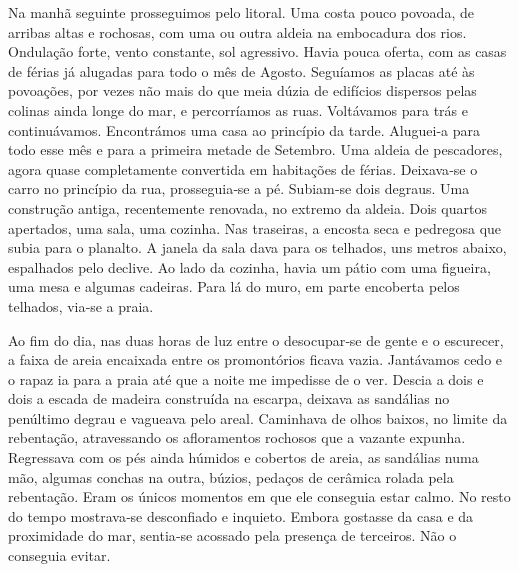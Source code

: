 Na manhã seguinte prosseguimos pelo litoral. Uma costa pouco povoada, de
arribas altas e rochosas, com uma ou outra aldeia na embocadura dos
rios. Ondulação forte, vento constante, sol agressivo. Havia pouca
oferta, com as casas de férias já alugadas para todo o mês de Agosto.
Seguíamos as placas até às povoações, por vezes não mais do que meia
dúzia de edifícios dispersos pelas colinas ainda longe do mar, e
percorríamos as ruas. Voltávamos para trás e continuávamos. Encontrámos
uma casa ao princípio da tarde. Aluguei­‑a para todo esse mês e para a
primeira metade de Setembro. Uma aldeia de pescadores, agora quase
completamente convertida em habitações de férias. Deixava­‑se o carro no
princípio da rua, prosseguia­‑se a pé. Subiam­‑se dois degraus. Uma
construção antiga, recentemente renovada, no extremo da aldeia. Dois
quartos apertados, uma sala, uma cozinha. Nas traseiras, a encosta seca
e pedregosa que subia para o planalto. A janela da sala dava para os
telhados, uns metros abaixo, espalhados pelo declive. Ao lado da
cozinha, havia um pátio com uma figueira, uma mesa e algumas cadeiras.
Para lá do muro, em parte encoberta pelos telhados, via­‑se a praia.

Ao fim do dia, nas duas horas de luz entre o desocupar­‑se de gente e o
escurecer, a faixa de areia encaixada entre os promontórios ficava
vazia. Jantávamos cedo e o rapaz ia para a praia até que a noite me
impedisse de o ver. Descia a dois e dois a escada de madeira construída
na escarpa, deixava as sandálias no penúltimo degrau e vagueava pelo
areal. Caminhava de olhos baixos, no limite da rebentação, atravessando
os afloramentos rochosos que a vazante expunha. Regressava com os pés
ainda húmidos e cobertos de areia, as sandálias numa mão, algumas
conchas na outra, búzios, pedaços de cerâmica rolada pela rebentação.
Eram os únicos momentos em que ele conseguia estar calmo. No resto do
tempo mostrava­‑se desconfiado e inquieto. Embora gostasse da casa e da
proximidade do mar, sentia­‑se acossado pela presença de terceiros. Não
o conseguia evitar.

